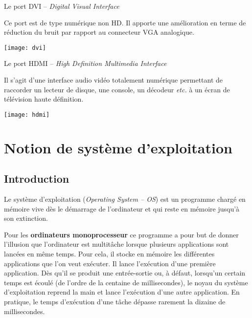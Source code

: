 \begin{minipage}[c]{.85\linewidth}
Le port DVI -- \textit{Digital Visual Interface}

Ce port est de type numérique non HD. Il apporte une amélioration en terme de réduction du bruit par rapport au connecteur VGA analogique.
\end{minipage} \hfill
\begin{minipage}[c]{.14\linewidth}
\begin{center}
\texttt{[image: dvi]}
\end{center}
\end{minipage}


\begin{minipage}[c]{.85\linewidth}
Le port HDMI -- \textit{High Definition Multimedia Interface}

Il s'agit d'une interface audio vidéo totalement numérique permettant de raccorder un lecteur de disque, une console, un décodeur \textit{etc.} à un écran de télévision haute définition.
\end{minipage} \hfill
\begin{minipage}[c]{.14\linewidth}
\begin{center}
\texttt{[image: hdmi]}
\end{center}
\end{minipage}



\section{Notion de système d'exploitation}

\subsection{Introduction}

Le système d'exploitation (\textit{Operating System -- OS}) est un programme chargé en mémoire vive dès le démarrage de l'ordinateur et qui reste en mémoire jusqu'à son extinction. 

Pour les \textbf{ordinateurs monoprocesseur} ce programme a pour but de donner l’illusion que l’ordinateur est multitâche lorsque plusieurs applications sont lancées en même temps. Pour cela, il stocke en mémoire les différentes applications que l’on veut exécuter. Il lance l’exécution d’une première application. Dès qu’il se produit une entrée-sortie ou, à défaut, lorsqu’un certain temps est écoulé (de l’ordre de la centaine de millisecondes), le noyau du système d’exploitation reprend la main et lance l’exécution d’une autre application. En pratique, le temps d’exécution d’une tâche dépasse rarement la dizaine de millisecondes.

